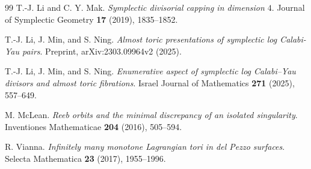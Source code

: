 \documentclass[11pt, reqno]{amsart}
\theoremstyle{definition}
\begin{document}
\begin{thebibliography}{99}
T.-J. Li and C. Y. Mak.
\textit{Symplectic divisorial capping in dimension $4$}.
Journal of Symplectic Geometry \textbf{17} (2019), 1835--1852.


T.-J. Li, J. Min, and S. Ning.
\textit{Almost toric presentations of symplectic log Calabi-Yau pairs}.
Preprint, arXiv:2303.09964v2 (2025).

T.-J. Li, J. Min, and S. Ning.
\textit{Enumerative aspect of symplectic log Calabi--Yau divisors and almost toric fibrations}.
Israel Journal of Mathematics \textbf{271} (2025), 557--649.

M. McLean.
\textit{Reeb orbits and the minimal discrepancy of an isolated singularity}.
Inventiones Mathematicae \textbf{204} (2016), 505--594.


R. Vianna.
\textit{Infinitely many monotone Lagrangian tori in del Pezzo surfaces}.
Selecta Mathematica \textbf{23} (2017), 1955--1996.






\end{thebibliography}
\end{document}
